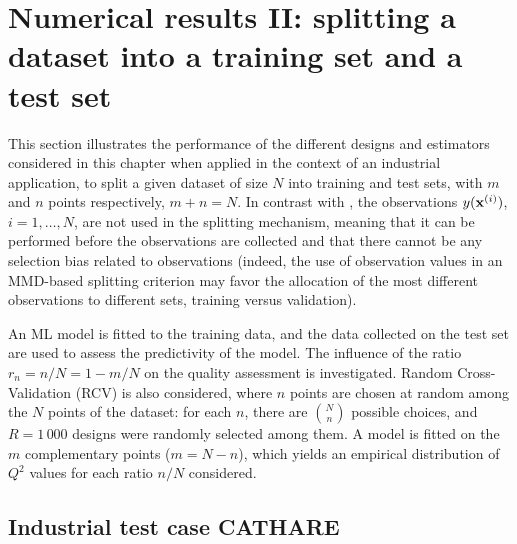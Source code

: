 \section{Numerical results II: splitting a dataset into a training set and a test set}\label{sec:val_res2}
This section illustrates the performance of the different designs and estimators considered in this chapter when applied in the context of an industrial application, to split a given dataset of size $N$ into training and test sets, with $m$ and $n$ points respectively, $m+n=N$. 
In contrast with \citet{josvak21}, the observations $y({\bf x}^{(i)})$, $i=1,\ldots,N$, are not used in the splitting mechanism, meaning that it can be performed before the observations are collected and that there cannot be any selection bias related to observations 
(indeed, the use of observation values in an MMD-based splitting criterion may favor the allocation of the most different observations to different sets, training versus validation).

An ML model is fitted to the training data, and the data collected on the test set are used to assess the predictivity of the model. 
The influence of the ratio $r_n=n/N=1-m/N$ on the quality assessment is investigated. 
Random Cross-Validation (RCV) is also considered, where $n$ points are chosen at random among the $N$ points of the dataset: for each $n$, there are $N \choose n$ possible choices, and $R=1\,000$ designs were randomly selected among them. 
A model is fitted on the $m$ complementary points ($m=N-n$), which yields an empirical distribution of $Q^2$ values for each ratio $n/N$ considered. 

\subsection{Industrial test case CATHARE}

